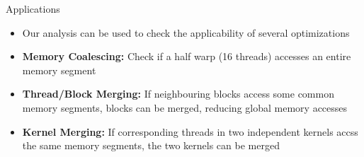 \documentclass{beamer}
\renewcommand{\|}{\:|\:}
\begin{document}
\begin{frame}{Applications}

\begin{itemize}
  \item Our analysis can be used to check the applicability of several optimizations
  \item \textbf{Memory Coalescing:} Check if a half warp (16 threads) accesses an entire memory segment
  \item \textbf{Thread/Block Merging:} If neighbouring blocks access some common memory segments, blocks can be merged, reducing global memory accesses
  \item \textbf{Kernel Merging:} If corresponding threads in two independent kernels accss the same memory segments, the two kernels can be merged
\end{itemize}
\end{frame}
\end{document}
